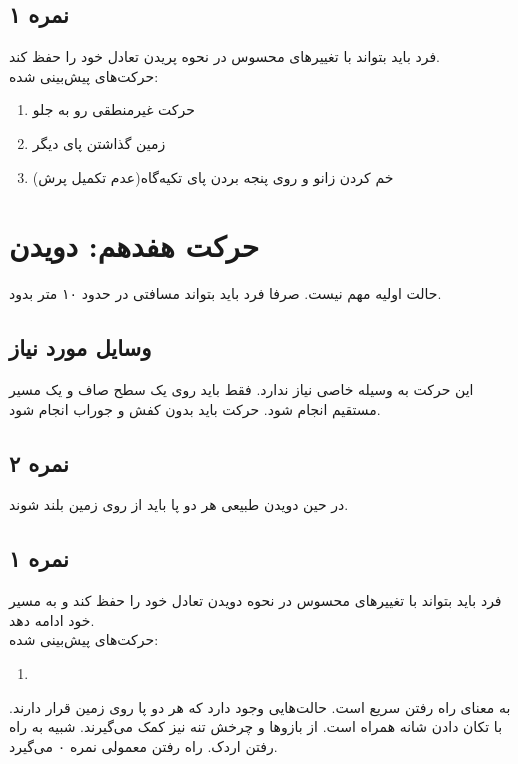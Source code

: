 \documentclass[12pt]{report}
\begin{document}
	\subsection*{نمره ۱}
	فرد باید بتواند با تغییر‌های محسوس در نحوه پریدن تعادل خود را حفظ کند.\\
	حرکت‌های پیش‌بینی شده:
	\begin{enumerate}
		\item حرکت غیرمنطقی رو به جلو
		\item زمین گذاشتن پای دیگر
		\item خم کردن زانو و روی پنجه بردن پای تکیه‌گاه(عدم تکمیل پرش)
	\end{enumerate}
	\newpage
	
	\section*{حرکت هفدهم: دویدن}
	حالت اولیه مهم نیست. صرفا فرد باید بتواند مسافتی در حدود ۱۰ متر بدود.
	\subsection*{وسایل مورد نیاز}
	این حرکت به وسیله خاصی نیاز ندارد. فقط باید روی یک سطح صاف و یک مسیر مستقیم انجام شود. حرکت باید بدون کفش و جوراب انجام شود.
	\subsection*{نمره ۲}
	در حین دویدن طبیعی هر دو پا باید از روی زمین بلند شوند.
	\subsection*{نمره ۱}
	فرد باید بتواند با تغییر‌های محسوس در نحوه دویدن تعادل خود را حفظ کند و به مسیر خود ادامه دهد.\\
	حرکت‌های پیش‌بینی شده:
	\begin{enumerate}
		\item {}
	\end{enumerate}
	به معنای راه رفتن سریع است. حالت‌هایی وجود دارد که هر دو پا روی زمین قرار دارند. با تکان دادن شانه‌ همراه است. از بازو‌ها و چرخش تنه نیز کمک می‌گیرند. شبیه به راه رفتن اردک. راه رفتن معمولی نمره ۰ می‌گیرد.
\end{document}
